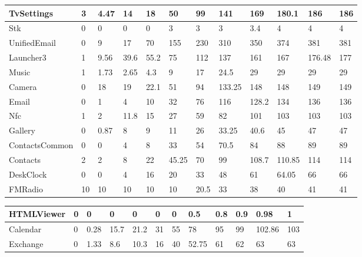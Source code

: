 \begin{tabular}{|l|l|l|l|l|l|l|l|l|l|l|l|}
\hline
TvSettings&3&4.47&14&18&50&99&141&169&180.1&186&186\\
\hline
Stk&0&0&0&0&3&3&3&3.4&4&4&4\\
\hline
UnifiedEmail&0&9&17&70&155&230&310&350&374&381&381\\
\hline
Launcher3&1&9.56&39.6&55.2&75&112&137&161&167&176.48&177\\
\hline
Music&1&1.73&2.65&4.3&9&17&24.5&29&29&29&29\\
\hline
Camera&0&18&19&22.1&51&94&133.25&148&148&149&149\\
\hline
Email&0&1&4&10&32&76&116&128.2&134&136&136\\
\hline
Nfc&1&2&11.8&15&27&59&82&101&103&103&103\\
\hline
Gallery&0&0.87&8&9&11&26&33.25&40.6&45&47&47\\
\hline
ContactsCommon&0&0&4&8&33&54&70.5&84&88&89&89\\
\hline
Contacts&2&2&8&22&45.25&70&99&108.7&110.85&114&114\\
\hline
DeskClock&0&0&4&16&20&33&48&61&64.05&66&66\\
\hline
FMRadio&10&10&10&10&10&20.5&33&38&40&41&41\\
\hline
\end{tabular}
\newline
\begin{tabular}{|l|l|l|l|l|l|l|l|l|l|l|l|}
\hline
HTMLViewer&0&0&0&0&0&0&0.5&0.8&0.9&0.98&1\\
\hline
Calendar&0&0.28&15.7&21.2&31&55&78&95&99&102.86&103\\
\hline
Exchange&0&1.33&8.6&10.3&16&40&52.75&61&62&63&63\\
\hline
\end{tabular}
